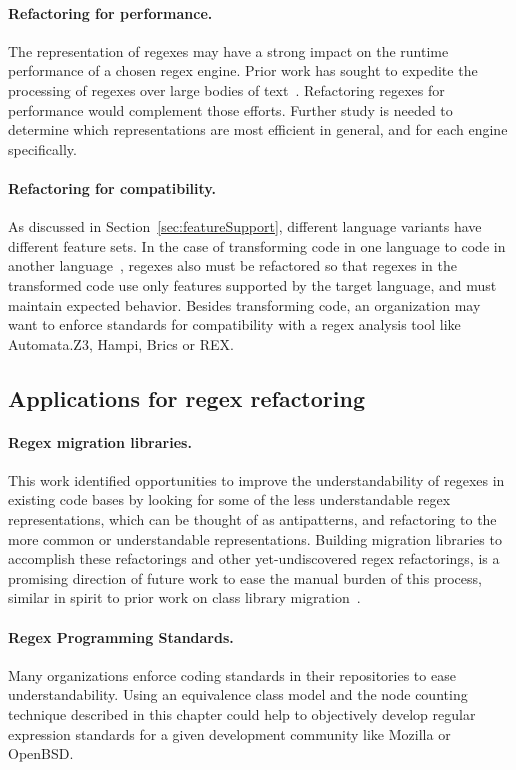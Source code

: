 \paragraph{Refactoring for performance.}  The representation of regexes may have a strong impact on the runtime performance of a chosen regex engine. Prior work has sought to expedite the processing of regexes over large bodies of text~.  Refactoring regexes for performance would complement those efforts.  Further study is needed to determine which representations are most efficient in general, and for each engine specifically.

\paragraph{Refactoring for compatibility.}  As discussed in Section~\ref{sec:featureSupport}, different language variants have different feature sets.  In the case of transforming code in one language to code in another language~, regexes also must be refactored so that regexes in the transformed code use only features supported by the target language, and must maintain expected behavior.  Besides transforming code, an organization may want to enforce standards for compatibility with a regex analysis tool like Automata.Z3, Hampi, Brics or REX.

\subsection{Applications for regex refactoring}

\paragraph{Regex migration libraries.}  This work identified opportunities to improve the understandability of regexes in existing code bases by looking for some of the less understandable regex representations, which can be thought of as antipatterns, and refactoring to the more common or understandable representations.  Building migration libraries to accomplish these refactorings and other yet-undiscovered regex refactorings, is a promising direction of future work to ease the manual burden of this process, similar in spirit to prior work on class library migration~.

\paragraph{Regex Programming Standards.}  Many organizations enforce coding standards in their repositories to ease understandability.  Using an equivalence class model and the node counting technique described in this chapter could help to objectively develop regular expression standards for a given development community like Mozilla or OpenBSD.
